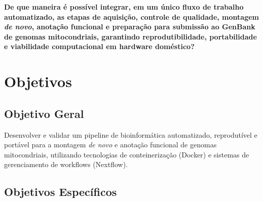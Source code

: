 \textbf{De que maneira é possível integrar, em um único fluxo de trabalho automatizado, as etapas de aquisição, controle de qualidade, montagem \textit{de novo}, anotação funcional e preparação para submissão ao GenBank de genomas mitocondriais, garantindo reprodutibilidade, portabilidade e viabilidade computacional em hardware doméstico?}

\section{Objetivos}

\subsection{Objetivo Geral}

Desenvolver e validar um pipeline de bioinformática automatizado, reprodutível e portável para a montagem \textit{de novo} e anotação funcional de genomas mitocondriais, utilizando tecnologias de conteinerização (Docker) e sistemas de gerenciamento de workflows (Nextflow).

\subsection{Objetivos Específicos}

